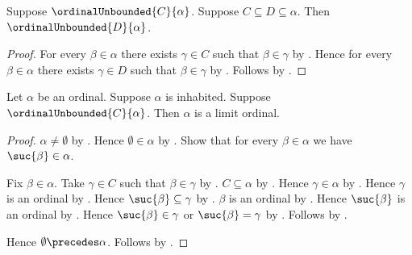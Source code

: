 \begin{proposition}\label{ordinal_unbounded_superset}
    Suppose $\ordinalUnbounded{C}{\alpha}$.
    Suppose $C\subseteq D\subseteq\alpha$.
    Then $\ordinalUnbounded{D}{\alpha}$.
\end{proposition}
\begin{proof}
    For every $\beta\in\alpha$ there exists $\gamma\in C$ such that
        $\beta\in\gamma$ by .
    Hence for every $\beta\in\alpha$ there exists $\gamma\in D$ such that
        $\beta\in\gamma$ by .
    Follows by .
\end{proof}

\begin{proposition}\label{positive_ordinal_with_unbounded_subset_is_limit}
    Let $\alpha$ be an ordinal.
    Suppose $\alpha$ is inhabited.
    Suppose $\ordinalUnbounded{C}{\alpha}$.
    Then $\alpha$ is a limit ordinal.
\end{proposition}
\begin{proof}
    $\alpha\neq\emptyset$ by .
    Hence $\emptyset\in\alpha$
        by .
    Show that for every $\beta\in\alpha$ we have $\suc{\beta}\in\alpha$.
    \begin{subproof}
        Fix $\beta\in\alpha$.
        Take $\gamma\in C$ such that $\beta\in\gamma$
            by .
        $C\subseteq\alpha$ by .
        Hence $\gamma\in\alpha$ by .
        Hence $\gamma$ is an ordinal by .
        Hence $\suc{\beta}\subseteq\gamma$
            by .
        $\beta$ is an ordinal by .
        Hence $\suc{\beta}$ is an ordinal by .
        Hence $\suc{\beta}\in\gamma$ or $\suc{\beta}=\gamma$
            by .
        Follows by .
    \end{subproof}
    Hence $\emptyset\precedes\alpha$.
    Follows by .
\end{proof}

